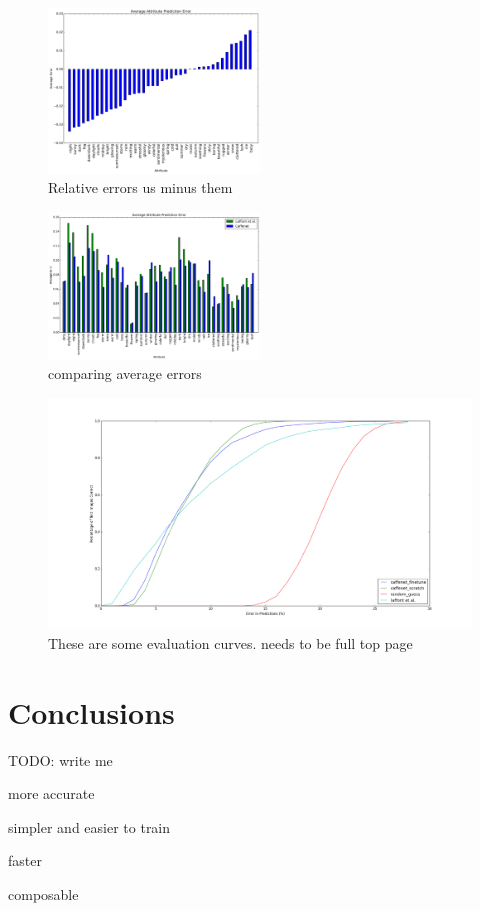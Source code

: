 \documentclass{article}
\begin{document}
\begin{figure}[t]
	\centering
		\includegraphics[width=0.5\textwidth]{figs/rel_err_tight.png}
		\caption{Relative errors us minus them}\label{fig:relerr}
\end{figure}

\begin{figure}[t]
	\centering
		\includegraphics[width=0.5\textwidth]{figs/avg_err_compare_tight.png}
		\caption{comparing average errors}\label{fig:compare}
\end{figure}

\begin{figure}[t]
	\centering
		\includegraphics[width=1.0\textwidth]{figs/fig_1.png}
		\caption{These are some evaluation curves. needs to be full top page}
\end{figure}

\section{Conclusions}

TODO: write me

more accurate

simpler and easier to train

faster

composable



\end{document}
